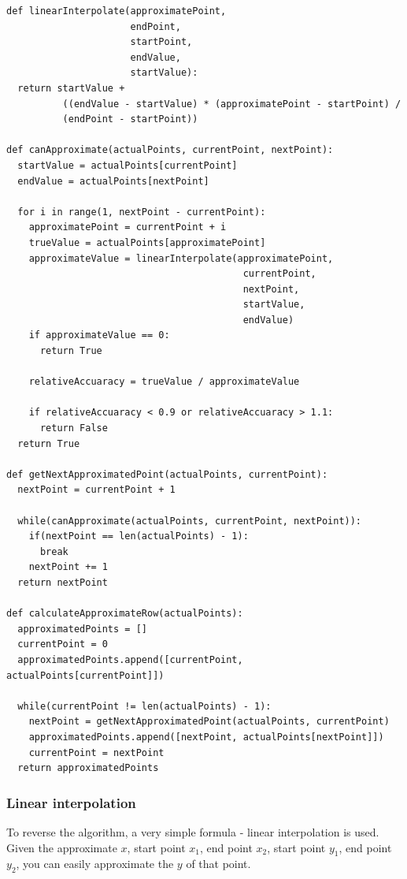 \documentclass[12pt]{article}
\begin{document}
\begin{verbatim}
def linearInterpolate(approximatePoint,
                      endPoint,
                      startPoint,
                      endValue,
                      startValue):
  return startValue +
          ((endValue - startValue) * (approximatePoint - startPoint) /
          (endPoint - startPoint))

def canApproximate(actualPoints, currentPoint, nextPoint):
  startValue = actualPoints[currentPoint]
  endValue = actualPoints[nextPoint]

  for i in range(1, nextPoint - currentPoint):
    approximatePoint = currentPoint + i
    trueValue = actualPoints[approximatePoint]
    approximateValue = linearInterpolate(approximatePoint,
                                          currentPoint,
                                          nextPoint,
                                          startValue,
                                          endValue)
    if approximateValue == 0:
      return True

    relativeAccuaracy = trueValue / approximateValue

    if relativeAccuaracy < 0.9 or relativeAccuaracy > 1.1:
      return False
  return True

def getNextApproximatedPoint(actualPoints, currentPoint):
  nextPoint = currentPoint + 1

  while(canApproximate(actualPoints, currentPoint, nextPoint)):
    if(nextPoint == len(actualPoints) - 1):
      break
    nextPoint += 1
  return nextPoint

def calculateApproximateRow(actualPoints):
  approximatedPoints = []
  currentPoint = 0
  approximatedPoints.append([currentPoint, actualPoints[currentPoint]])

  while(currentPoint != len(actualPoints) - 1):
    nextPoint = getNextApproximatedPoint(actualPoints, currentPoint)
    approximatedPoints.append([nextPoint, actualPoints[nextPoint]])
    currentPoint = nextPoint
  return approximatedPoints

\end{verbatim}

\subsubsection{Linear interpolation}
To reverse the algorithm, a very simple formula - linear interpolation is used. Given the approximate $x$, start point $x_1$, end point $x_2$, start point $y_1$, end point $y_2$, you can easily approximate the $y$ of that point.
\end{document}
